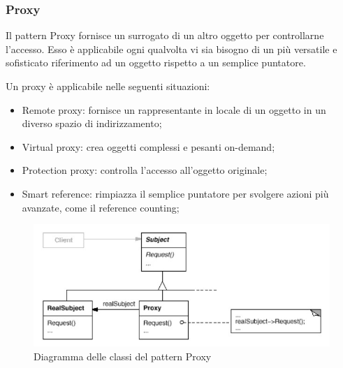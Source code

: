 \subsubsection{Proxy}
\label{ssub:proxy}

Il pattern Proxy fornisce un surrogato di un altro oggetto per controllarne
l'accesso. Esso è applicabile ogni qualvolta vi sia bisogno di un più versatile
e sofisticato riferimento ad un oggetto rispetto a un semplice puntatore.

Un proxy è applicabile nelle seguenti situazioni:

\begin{itemize}
    \item Remote proxy: fornisce un rappresentante in locale di un oggetto in un
    diverso spazio di indirizzamento;
    \item Virtual proxy: crea oggetti complessi e pesanti on-demand;
    \item Protection proxy: controlla l'accesso all'oggetto originale;
    \item Smart reference: rimpiazza il semplice puntatore per svolgere azioni
    più avanzate, come il reference counting;
\end{itemize}

\begin{figure}[h!]
  \centering
  \includegraphics[scale=0.55]{imgs/proxy.jpg}
  \caption{Diagramma delle classi del pattern Proxy}
\end{figure}
